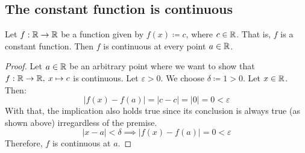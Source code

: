 \subsection{The constant function is continuous}

\begin{theorem}
    Let $f: \mathbb{R} \to \mathbb{R}$ be a function given by $f(x) \coloneqq c$, where $c \in \mathbb{R}$. That is, $f$ is a constant function. Then $f$ is continuous at every point $a \in \mathbb{R}$.
\end{theorem}

\begin{proof}
    Let $a \in \mathbb{R}$ be an arbitrary point where we want to show that $f: \mathbb{R} \to \mathbb{R}, \: x \mapsto c$ is continuous. Let $\varepsilon > 0$. We choose $\delta \coloneqq 1 > 0$. Let $x \in \mathbb{R}$. Then:
    \[
        |f(x) - f(a)| = |c - c| = |0| = 0 < \varepsilon
    \]
    With that, the implication also holds true since its conclusion is always true (as shown above) irregardless of the premise.
    \[
        |x - a| < \delta \implies |f(x) - f(a)| = 0 < \varepsilon
    \]
    Therefore, $f$ is continuous at $a$.
\end{proof}
